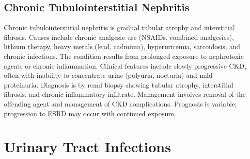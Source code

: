 \subsection{Chronic Tubulointerstitial Nephritis}
\label{sec:Chronic Tubulointerstitial Nephritis}
Chronic tubulointerstitial nephritis is gradual tubular atrophy and interstitial fibrosis. Causes include chronic analgesic use (NSAIDs, combined analgesics), lithium therapy, heavy metals (lead, cadmium), hyperuricemia, sarcoidosis, and chronic infections. The condition results from prolonged exposure to nephrotoxic agents or chronic inflammation. Clinical features include slowly progressive CKD, often with inability to concentrate urine (polyuria, nocturia) and mild proteinuria. Diagnosis is by renal biopsy showing tubular atrophy, interstitial fibrosis, and chronic inflammatory infiltrate. Management involves removal of the offending agent and management of CKD complications. Prognosis is variable; progression to ESRD may occur with continued exposure.

\section{Urinary Tract Infections}








\label{sec:Urinary Tract Infections}

